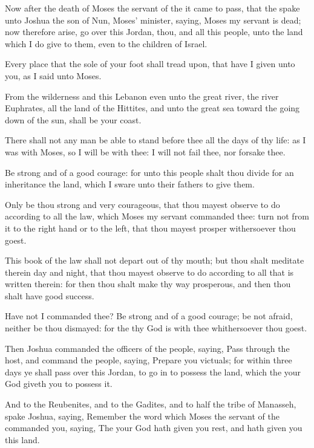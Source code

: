 \Chapter
\Verse Now after the death of Moses the servant of the \LORD it came to pass, that the \LORD spake unto Joshua the son of Nun, Moses' minister, saying, \Verse Moses my servant is dead; now therefore arise, go over this Jordan, thou, and all this people, unto the land which I do give to them, even to the children of Israel.

\Verse Every place that the sole of your foot shall tread upon, that have I given unto you, as I said unto Moses.

\Verse From the wilderness and this Lebanon even unto the great river, the river Euphrates, all the land of the Hittites, and unto the great sea toward the going down of the sun, shall be your coast.

\Verse There shall not any man be able to stand before thee all the days of thy life: as I was with Moses, so I will be with thee: I will not fail thee, nor forsake thee.

\Verse Be strong and of a good courage: for unto this people shalt thou divide for an inheritance the land, which I sware unto their fathers to give them.

\Verse Only be thou strong and very courageous, that thou mayest observe to do according to all the law, which Moses my servant commanded thee: turn not from it to the right hand or to the left, that thou mayest prosper withersoever thou goest.

\Verse This book of the law shall not depart out of thy mouth; but thou shalt meditate therein day and night, that thou mayest observe to do according to all that is written therein: for then thou shalt make thy way prosperous, and then thou shalt have good success.

\Verse Have not I commanded thee? Be strong and of a good courage; be not afraid, neither be thou dismayed: for the \LORD thy God is with thee whithersoever thou goest.

\Verse Then Joshua commanded the officers of the people, saying, \Verse Pass through the host, and command the people, saying, Prepare you victuals; for within three days ye shall pass over this Jordan, to go in to possess the land, which the \LORD your God giveth you to possess it.

\Verse And to the Reubenites, and to the Gadites, and to half the tribe of Manasseh, spake Joshua, saying, \Verse Remember the word which Moses the servant of the \LORD commanded you, saying, The \LORD your God hath given you rest, and hath given you this land.

